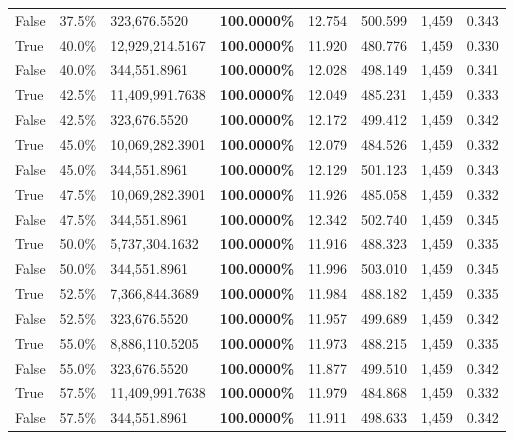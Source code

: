 \begin{table}[H]
\begin{tabular}{lllrllll}
\cline{1-8}
False & 37.5\% & 323,676.5520 & \bfseries \color{red} 100.0000\% & 12.754 & 500.599 & 1,459 & 0.343 \\
\cline{1-8}
True & 40.0\% & 12,929,214.5167 & \bfseries \color{red} 100.0000\% & 11.920 & 480.776 & 1,459 & 0.330 \\
\cline{1-8}
False & 40.0\% & 344,551.8961 & \bfseries \color{red} 100.0000\% & 12.028 & 498.149 & 1,459 & 0.341 \\
\cline{1-8}
True & 42.5\% & 11,409,991.7638 & \bfseries \color{red} 100.0000\% & 12.049 & 485.231 & 1,459 & 0.333 \\
\cline{1-8}
False & 42.5\% & 323,676.5520 & \bfseries \color{red} 100.0000\% & 12.172 & 499.412 & 1,459 & 0.342 \\
\cline{1-8}
True & 45.0\% & 10,069,282.3901 & \bfseries \color{red} 100.0000\% & 12.079 & 484.526 & 1,459 & 0.332 \\
\cline{1-8}
False & 45.0\% & 344,551.8961 & \bfseries \color{red} 100.0000\% & 12.129 & 501.123 & 1,459 & 0.343 \\
\cline{1-8}
True & 47.5\% & 10,069,282.3901 & \bfseries \color{red} 100.0000\% & 11.926 & 485.058 & 1,459 & 0.332 \\
\cline{1-8}
False & 47.5\% & 344,551.8961 & \bfseries \color{red} 100.0000\% & 12.342 & 502.740 & 1,459 & 0.345 \\
\cline{1-8}
True & 50.0\% & 5,737,304.1632 & \bfseries \color{red} 100.0000\% & 11.916 & 488.323 & 1,459 & 0.335 \\
\cline{1-8}
False & 50.0\% & 344,551.8961 & \bfseries \color{red} 100.0000\% & 11.996 & 503.010 & 1,459 & 0.345 \\
\cline{1-8}
True & 52.5\% & 7,366,844.3689 & \bfseries \color{red} 100.0000\% & 11.984 & 488.182 & 1,459 & 0.335 \\
\cline{1-8}
False & 52.5\% & 323,676.5520 & \bfseries \color{red} 100.0000\% & 11.957 & 499.689 & 1,459 & 0.342 \\
\cline{1-8}
True & 55.0\% & 8,886,110.5205 & \bfseries \color{red} 100.0000\% & 11.973 & 488.215 & 1,459 & 0.335 \\
\cline{1-8}
False & 55.0\% & 323,676.5520 & \bfseries \color{red} 100.0000\% & 11.877 & 499.510 & 1,459 & 0.342 \\
\cline{1-8}
True & 57.5\% & 11,409,991.7638 & \bfseries \color{red} 100.0000\% & 11.979 & 484.868 & 1,459 & 0.332 \\
\cline{1-8}
False & 57.5\% & 344,551.8961 & \bfseries \color{red} 100.0000\% & 11.911 & 498.633 & 1,459 & 0.342 \\

\end{tabular}
\end{table}
